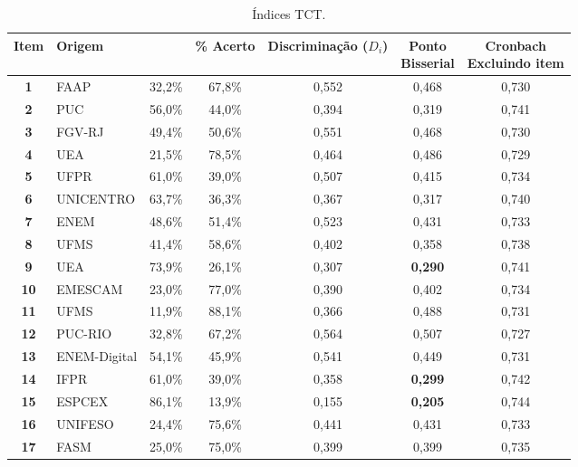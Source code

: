 \begin{table}[H]
	\centering
		\caption{Índices TCT.}
		\label{tabela-tct}
		\begin{tabular*}{\textwidth}{@{\extracolsep{\fill}}clccccc@{}}
			\toprule
			\textbf{Item} & \textbf{Origem} &
			 \makecell{\textbf{\% Erro} } & 
			 \makecell{\textbf{\% Acerto}\\}&
			  \makecell{\textbf{Discriminação} \\ \textbf{($D_i$)}} & \makecell{\textbf{Ponto} \\ \textbf{Bisserial}} & \makecell{\textbf{Cronbach} \\ \textbf{Excluindo item}} \\ 
\hline \textbf{1 }& FAAP & 32,2\% & 67,8\% & 0,552 & 0,468 & 0,730 \\ 
\hline \textbf{2 }& PUC & 56,0\% & 44,0\% & 0,394 & 0,319 & 0,741 \\ 
\hline \textbf{3 }& FGV-RJ & 49,4\% & 50,6\% & 0,551 & 0,468 & 0,730 \\ 
\hline \textbf{4 }& UEA & 21,5\% & 78,5\% & 0,464 & 0,486 & 0,729 \\ 
\hline \textbf{5 }& UFPR & 61,0\% & 39,0\% & 0,507 & 0,415 & 0,734 \\ 
\hline \textbf{6 }& UNICENTRO & 63,7\% & 36,3\% & 0,367 & 0,317 & 0,740 \\
\hline \textbf{7 }& ENEM & 48,6\% & 51,4\% & 0,523 & 0,431 & 0,733 \\ 
\hline \textbf{8 }& UFMS & 41,4\% & 58,6\% & 0,402 & 0,358 & 0,738 \\ 
\hline \textbf{9 }& UEA & 73,9\% & 26,1\% & 0,307 & \textbf{0,290} & 0,741 \\ 
\hline \textbf{10} & EMESCAM & 23,0\% & 77,0\% & 0,390 & 0,402 & 0,734 \\ 
\hline \textbf{11} & UFMS & 11,9\% & 88,1\% & 0,366 & 0,488 & 0,731 \\ 
\hline \textbf{12} & PUC-RIO & 32,8\% & 67,2\% & 0,564 & 0,507 & 0,727 \\ 
\hline \textbf{13} & ENEM-Digital & 54,1\% & 45,9\% & 0,541 & 0,449 & 0,731 \\ 
\hline \textbf{14} & IFPR & 61,0\% & 39,0\% & 0,358 & \textbf{0,299} & 0,742 \\ 
\hline \textbf{15} & ESPCEX & 86,1\% & 13,9\% & 0,155 & \textbf{0,205} & 0,744 \\ 
\hline \textbf{16} & UNIFESO & 24,4\% & 75,6\% & 0,441 & 0,431 & 0,733 \\ 
\hline \textbf{17} & FASM & 25,0\% & 75,0\% & 0,399 & 0,399 & 0,735 \\ 

\end{tabular*}
\end{table}
